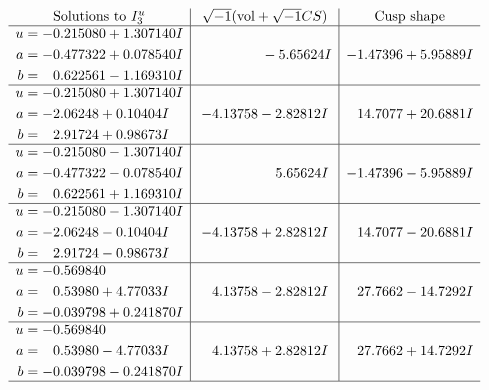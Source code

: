 \documentclass[1p]{elsarticle_modified}
\theoremstyle{definition}
\newcommand{\I}{\sqrt{-1}}
\begin{document}
$$\begin{array}{c|c|c}  
\text{Solutions to }I^u_{3}& \I (\text{vol} + \sqrt{-1}CS) & \text{Cusp shape}\\
 \hline 
\begin{aligned}
u &= -0.215080 + 1.307140 I \\
a &= -0.477322 + 0.078540 I \\
b &= \phantom{-}0.622561 - 1.169310 I\end{aligned}
 & \phantom{-0.000000 } -5.65624 I & -1.47396 + 5.95889 I \\ \hline\begin{aligned}
u &= -0.215080 + 1.307140 I \\
a &= -2.06248 + 0.10404 I \\
b &= \phantom{-}2.91724 + 0.98673 I\end{aligned}
 & -4.13758 - 2.82812 I & \phantom{-}14.7077 + 20.6881 I \\ \hline\begin{aligned}
u &= -0.215080 - 1.307140 I \\
a &= -0.477322 - 0.078540 I \\
b &= \phantom{-}0.622561 + 1.169310 I\end{aligned}
 & \phantom{-0.000000 -}5.65624 I & -1.47396 - 5.95889 I \\ \hline\begin{aligned}
u &= -0.215080 - 1.307140 I \\
a &= -2.06248 - 0.10404 I \\
b &= \phantom{-}2.91724 - 0.98673 I\end{aligned}
 & -4.13758 + 2.82812 I & \phantom{-}14.7077 - 20.6881 I \\ \hline\begin{aligned}
u &= -0.569840\phantom{ +0.000000I} \\
a &= \phantom{-}0.53980 + 4.77033 I \\
b &= -0.039798 + 0.241870 I\end{aligned}
 & \phantom{-}4.13758 - 2.82812 I & \phantom{-}27.7662 - 14.7292 I \\ \hline\begin{aligned}
u &= -0.569840\phantom{ +0.000000I} \\
a &= \phantom{-}0.53980 - 4.77033 I \\
b &= -0.039798 - 0.241870 I\end{aligned}
 & \phantom{-}4.13758 + 2.82812 I & \phantom{-}27.7662 + 14.7292 I\\
 \hline 
 \end{array}$$\newpage\newpage\renewcommand{\arraystretch}{1}
\end{document}
